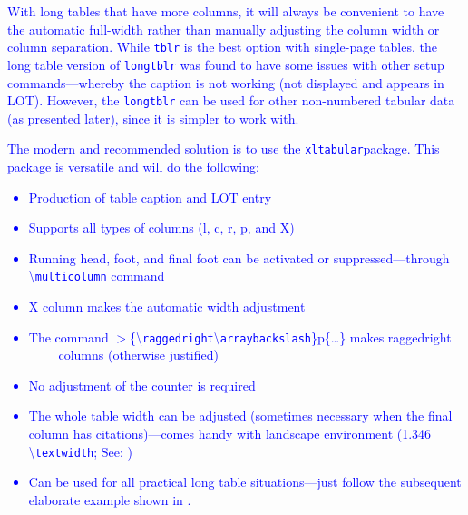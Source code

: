\documentclass[phd,showframe]{ndsu-thesis-2022}
\newcommand\italk[1]{\textcolor{blue}{#1}}  %
\newcommand\cmd[1]{\textbackslash\texttt{#1}}  %
\begin{document}
\italk{With long tables that have more columns, it will always be convenient to have the automatic full-width rather than manually adjusting the column width or column separation. While \texttt{tblr} is the best option with single-page tables, the long table version of \texttt{longtblr} was found to have some issues with other setup commands---whereby the caption is not working (not displayed and appears in LOT). However, the \texttt{longtblr} can be used for other non-numbered tabular data (as presented later), since it is simpler to work with.} 

\italk{The modern and recommended solution is to use the \texttt{xltabular}\cptp package. This package is versatile and will do the following:
\begin{itemize}
\item Production of table caption and LOT entry
\item Supports all types of columns (l, c, r, p, and X)
\item Running head, foot, and final foot can be activated or suppressed---through \\ \cmd{multicolumn} command
\item X column makes the automatic width adjustment
\item The command $>$\{\cmd{raggedright}\cmd{arraybackslash}\}p\{\ldots\} makes raggedright $\quad\quad$ columns (otherwise justified)
\item No adjustment of the counter is required
\item The whole table width can be adjusted (sometimes necessary when the final column has citations)---comes handy with landscape environment (1.346 \cmd{textwidth}; See: \Cref{tab:xltabularls})
\item Can be used for all practical long table situations---just follow the subsequent elaborate example shown in \Cref{tab:xltabular}.
\end{itemize}
}

\begingroup%
\end{document}
